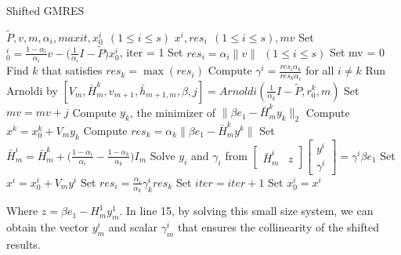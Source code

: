 \begin{algorithm}[H]
\caption{Shifted GMRES}
\label{alg:shifted_GMRES}
\begin{algorithmic}[1]
    \Require $\tilde P, v, m, \alpha_i, maxit, x_0^i ~~ (1 \leq i \leq s)$
    \Ensure $x^i, res_i ~~(1 \leq i \leq s), mv$
    \State Set $_0^i = \frac{1-\alpha_i}{\alpha_i} v - \Big(\frac{1}{\alpha_i} I - \tilde P \Big) x_0^i$, iter = 1
    \State Set $res_i = \alpha_i \lVert v \rVert ~~ (1 \leq i \leq s)$
    \State Set mv = 0
        \State Find $k$ that satisfies $res_k = \max (res_i)$
        \State Compute $\gamma^i = \frac{res_i \alpha_k}{res_k \alpha_i}$ for all $i \neq k$
        \State Run Arnoldi by $ [V_m, \bar H_m^k, v_{m+1}, \bar h_{m+1,m}, \beta, j] = Arnoldi(\frac{1}{\alpha_k}I - \tilde P, r_0^k, m)$
        \State Set $mv = mv + j$
        \State Compute $y_k$, the minimizer of $\lVert \beta e_1 - \bar H_m^k y_k \rVert_2$
        \State Compute $x^k = x_0^k + V_m y_k$
        \State Compute $res_k = \alpha_k \lVert \beta e_1 - \bar H_m^k y^k \rVert$
                \State Set $\bar H_m^i = \bar H_m^k + \Big( \frac{1-\alpha_i}{\alpha_i} - \frac{1-\alpha_k}{\alpha_k} \Big) I_m$
                \State Solve $y_i$ and $\gamma_i$ from $\begin{bmatrix} \bar H_m^i & z \end{bmatrix} \begin{bmatrix} y^i \\ \gamma^i \end{bmatrix} = \gamma^i \beta e_1$
                \State Set $x^i = x_0^i + V_m y^i$
                \State Set $res_i = \frac{\alpha_i}{\alpha_k} \gamma_k^i res_k$
            \EndIf
        \EndFor
        \State Set $iter = iter + 1$
        \State Set $x_0^i = x^i$
    \EndWhile
\end{algorithmic}
\end{algorithm}

\noindent Where $z = \beta e_1 - H_m^1 y_m^1$. In line 15, by solving this small size system, we can obtain the vector $y_m^i$ and scalar $\gamma_m^i$ that ensures the collinearity of the shifted results.

